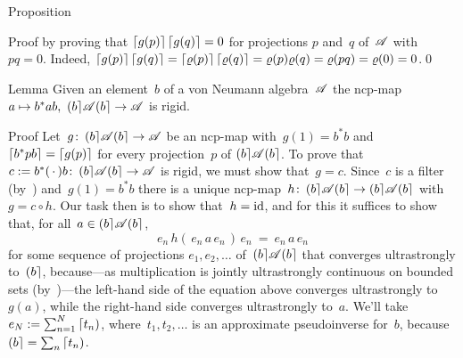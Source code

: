 \documentclass[a]{subfiles}
\begin{document}
\begin{parsec}
\begin{point}{Proposition}
\begin{point}{Proof}
by proving that
$\left\lceil g(p)\right\rceil\left\lceil g(q)\right\rceil=0$
for projections $p$ and~$q$ of~$\mathscr{A}$
with~$pq=0$.
Indeed,
$\left\lceil g(p)\right\rceil\left\lceil g(q)\right\rceil=\left\lceil\varrho(p)\right\rceil\left\lceil\varrho(q)\right\rceil
=\varrho(p)\varrho(q)=\varrho(pq)=\varrho(0)=0$.\qed
\end{point}
\end{point}
\begin{point}{Lemma}%
Given an element~$b$ of a von Neumann algebra~$\mathscr{A}$
the ncp-map $a\mapsto b^* a b,\ \ceilr{b}\!\scrA\!\ceilr{b}\to\scrA$
is rigid.
\begin{point}{Proof}%
Let~$g\colon \left(b\right\rceil\!\mathscr{A}\!\left(b\right\rceil\to\mathscr{A}$
be an ncp-map with~$g(1)=b^*b$
and $\left\lceil b^*pb\right\rceil=\left\lceil g(p)\right\rceil$ for every projection~$p$ 
of $\left(b\right\rceil\!\mathscr{A}\!\left(b\right\rceil$.
To prove that~$c:=b^*(\,\cdot\,) b
\colon \left(b\right\rceil\!\mathscr{A}\!\left(b\right\rceil\to \mathscr{A}$ is rigid,
we must show that~$g=c$.
Since~$c$ is a filter
(by~)
and~$g(1)=b^*b$
there is a unique ncp-map~$h\colon \left(b\right\rceil\!\mathscr{A}\!\left(b\right\rceil
\to\left(b\right\rceil\!\mathscr{A}\!\left(b\right\rceil$
with~$g=c\circ h$.
Our task then is to show that~$h=\operatorname{id}$,
and for this it suffices to show that,
for all~$a\in\left(b\right\rceil\!\mathscr{A}\!\left(b\right\rceil$,
\begin{equation}
\label{filter-rigid-1}
e_n\, h(\,e_n\, a\, e_n\,)\, e_n
\ = \ e_n \, a\,  e_n
\end{equation}
for some sequence of projections $e_1,e_2,\dotsc$
of~$\left(b\right\rceil\!\mathscr{A}\!\left(b\right\rceil$
that converges ultrastrongly to~$\left(b\right\rceil$,
because---as multiplication is jointly ultrastrongly continuous
on bounded sets (by~)---the left-hand side of the equation above 
converges ultrastrongly to~$g(a)$,
while the right-hand side converges ultrastrongly to~$a$.
We'll take $e_N := \sum_{n=1}^N \left\lceil t_n\right)$,
where~$t_1,t_2,\dotsc$
is an approximate pseudoinverse for~$b$,
because $\left(b\right\rceil = \sum_n\left\lceil t_n\right)$.


\end{point}
\end{point}
\end{parsec}
\end{document}
